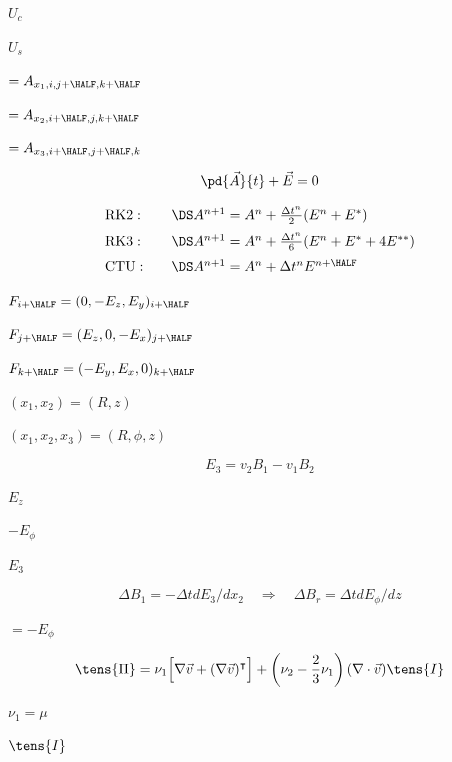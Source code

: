 \documentclass{article}
\begin{document}
$ U_c $
\pagebreak

$ U_s $
\pagebreak

$= A_{x_1, i, j+\HALF, k+\HALF}$
\pagebreak

$= A_{x_2, i+\HALF, j, k+\HALF}$
\pagebreak

$= A_{x_3, i+\HALF, j+\HALF, k}$
\pagebreak

\[   \pd{\vec{A}}{t} + \vec{E} = 0
\]
\pagebreak

\[ \begin{array}{ll}
  \rm{RK2:}\quad &\DS A^{n+1} = A^n + \frac{\Delta t^n}{2} (E^n + E^*) 
    \\ \noalign{\medskip}
  \rm{RK3:}\quad &\DS A^{n+1} = A^n + \frac{\Delta t^n}{6} (E^n + E^* + 4E^{**}) 
    \\ \noalign{\medskip}
  \rm{CTU:}\quad &\DS A^{n+1} = A^n + \Delta t^nE^{n+\HALF}
 \end{array}        
\]
\pagebreak

$ F_{i+\HALF} = (   0,-E_z, E_y)_{i+\HALF}$
\pagebreak

$ F_{j+\HALF} = ( E_z,   0,-E_x)_{j+\HALF}$
\pagebreak

$ F_{k+\HALF} = (-E_y, E_x,   0)_{k+\HALF}$
\pagebreak

$ (x_1,x_2) = (R,z) $
\pagebreak

$ (x_1,x_2,x_3) = (R,\phi,z)$
\pagebreak

\[   E_3 = v_2B_1 - v_1B_2
\]
\pagebreak

$ E_z $
\pagebreak

$ -E_\phi $
\pagebreak

$ E_3 $
\pagebreak

\[\Delta B_1 = -\Delta t dE_3/dx_2 \quad\Longrightarrow\quad
\Delta B_r =  \Delta t dE_\phi/dz
\]
\pagebreak

$ = -E_\phi $
\pagebreak

\[    \tens{\Pi} =  \nu_1\Big[\nabla\vec{v} + (\nabla\vec{v})^\intercal\Big]
                + \left(\nu_2 - \frac{2}{3}\nu_1\right)(\nabla\cdot\vec{v}) \tens{I}
\]
\pagebreak

$\nu_1 = \mu$
\pagebreak

$\tens{I}$
\pagebreak
\end{document}
